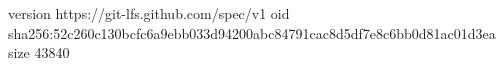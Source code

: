 version https://git-lfs.github.com/spec/v1
oid sha256:52c260c130bcfc6a9ebb033d94200abc84791cac8d5df7e8c6bb0d81ac01d3ea
size 43840
